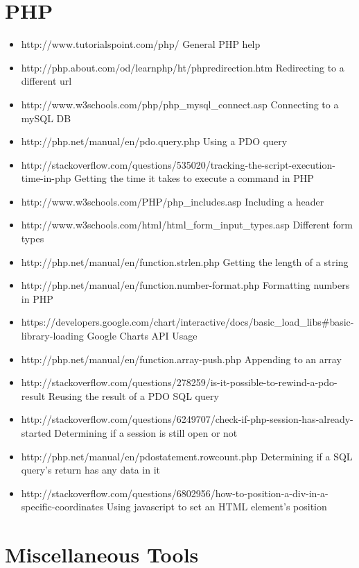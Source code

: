 \documentclass[12pt]{article}
\begin{document}
\section{PHP}
	\begin{itemize}
		\item http://www.tutorialspoint.com/php/
		\subitem General PHP help
		\item http://php.about.com/od/learnphp/ht/phpredirection.htm
		\subitem Redirecting to a different url
		\item http://www.w3schools.com/php/php\_mysql\_connect.asp
		\subitem Connecting to a mySQL DB
		\item http://php.net/manual/en/pdo.query.php
		\subitem Using a PDO query
		\item http://stackoverflow.com/questions/535020/tracking-the-script-execution-time-in-php
		\subitem Getting the time it takes to execute a command in PHP
		\item http://www.w3schools.com/PHP/php\_includes.asp
		\subitem Including a header
		\item http://www.w3schools.com/html/html\_form\_input\_types.asp
		\subitem Different form types
		\item http://php.net/manual/en/function.strlen.php
		\subitem Getting the length of a string
		\item http://php.net/manual/en/function.number-format.php
		\subitem Formatting numbers in PHP
		\item https://developers.google.com/chart/interactive/docs/basic_load_libs#basic-library-loading
		\subitem Google Charts API Usage
		\item http://php.net/manual/en/function.array-push.php
		\subitem Appending to an array
		\item http://stackoverflow.com/questions/278259/is-it-possible-to-rewind-a-pdo-result
		\subitem Reusing the result of a PDO SQL query
		\item http://stackoverflow.com/questions/6249707/check-if-php-session-has-already-started
		\subitem Determining if a session is still open or not
		\item http://php.net/manual/en/pdostatement.rowcount.php
		\subitem Determining if a SQL query's return has any data in it
		\item http://stackoverflow.com/questions/6802956/how-to-position-a-div-in-a-specific-coordinates
		\subitem Using javascript to set an HTML element's position
	\end{itemize}
\section{Miscellaneous Tools}
\end{document}
